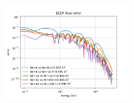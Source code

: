 \documentclass[mathserif, aspectratio=169]{beamer}
\begin{document}
\begin{frame}
\begin{figure}
{				\includegraphics[width=0.48\textwidth]{g0_mw_smoothed_eedf_final_error.png}
			}
		\end{figure}
	\end{frame}
\end{document}
